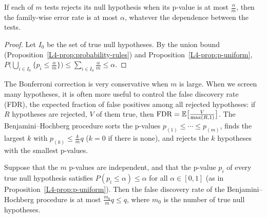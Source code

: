 \begin{proposition}\label{L4-prop:bonferroni}
    If each of $m$ tests rejects its null hypothesis when its p-value is at most $\frac{\alpha}{m}$, then the family-wise error rate is at most $\alpha$, whatever the dependence between the tests.
\end{proposition}

\begin{proof}
    Let $I_0$ be the set of true null hypotheses. By the union bound (Proposition~\ref{L4-prop:probability-rules}) and Proposition~\ref{L4-prop:p-uniform}, $P\big(\bigcup_{i \in I_0}\{p_i \leq \frac{\alpha}{m}\}\big) \leq \sum_{i \in I_0} \frac{\alpha}{m} \leq \alpha$.
\end{proof}

The Bonferroni correction is very conservative when $m$ is large. When we screen many hypotheses, it is often more useful to control the false discovery rate (FDR), the expected fraction of false positives among all rejected hypotheses: if $R$ hypotheses are rejected, $V$ of them true, then $\mathrm{FDR} = \mathbb{E}\big[\frac{V}{\max(R, 1)}\big]$. The Benjamini--Hochberg procedure sorts the p-values $p_{(1)} \leq \cdots \leq p_{(m)}$, finds the largest $k$ with $p_{(k)} \leq \frac{k}{m}q$ ($k = 0$ if there is none), and rejects the $k$ hypotheses with the smallest p-values.

\begin{theorem}\label{L4-thm:bh}
    Suppose that the $m$ p-values are independent, and that the p-value $p_i$ of every true null hypothesis satisfies $P(p_i \leq \alpha) \leq \alpha$ for all $\alpha \in [0, 1]$ (as in Proposition~\ref{L4-prop:p-uniform}). Then the false discovery rate of the Benjamini--Hochberg procedure is at most $\frac{m_0}{m}q \leq q$, where $m_0$ is the number of true null hypotheses.
\end{theorem}

